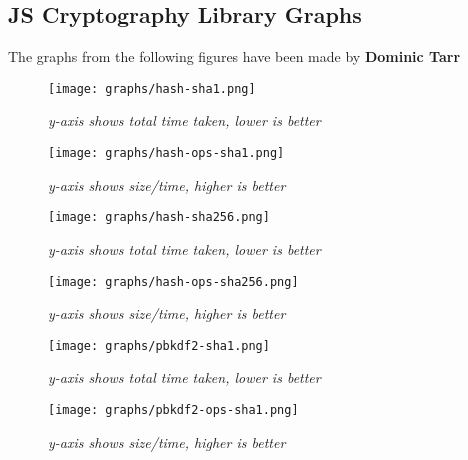 
\subsection{JS Cryptography Library Graphs}
The graphs from the following figures have been made by \textbf{Dominic Tarr} \cite {Tarr2014PerformanceLibraries.}

\begin{figure}[htpb]
\centering
\texttt{[image: graphs/hash-sha1.png]}
\caption{\small \sl y-axis shows total time taken, lower is better
\label{fig:hash-sha1}}  
\end{figure}

\begin{figure}[htpb]
\centering
\texttt{[image: graphs/hash-ops-sha1.png]}
\caption{\small \sl y-axis shows size/time, higher is better
\label{fig:hash-ops-sha1}}
\end{figure}

\begin{figure}[htpb]
\centering
\texttt{[image: graphs/hash-sha256.png]}
\caption{\small \sl y-axis shows total time taken, lower is better
\label{fig:hash-sha256}}
\end{figure}

\begin{figure}[htpb]
\centering
\texttt{[image: graphs/hash-ops-sha256.png]}
\caption{\small \sl y-axis shows size/time, higher is better
\label{fig:hash-ops-sha256}}
\end{figure} 

\begin{figure}[htpb]
\centering
\texttt{[image: graphs/pbkdf2-sha1.png]}
\caption{\small \sl y-axis shows total time taken, lower is better
\label{fig:pbkdf2-sha1}}
\end{figure}

\begin{figure}[htpb]
\centering
\texttt{[image: graphs/pbkdf2-ops-sha1.png]}
\caption{\small \sl y-axis shows size/time, higher is better
\label{fig:pbkdf2-ops-sha1}}
\end{figure}

